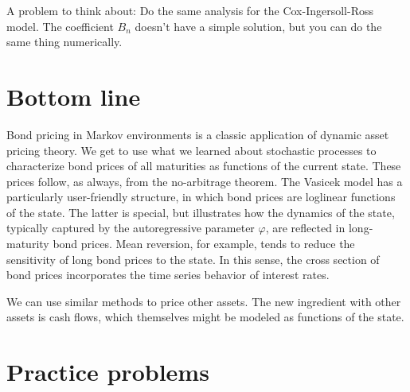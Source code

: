 \documentclass[11pt]{article}
\begin{document}
A problem to think about:  Do the same analysis for the Cox-Ingersoll-Ross model.
The coefficient $B_n$ doesn't have a simple solution, but you can do the same thing
numerically.

\begin{comment}
\section{The theory of long rates}
****** ???? *****
Perron-Frobenius stuff ???
\end{comment}


\section*{Bottom line}

Bond pricing in Markov environments is a classic application of dynamic asset pricing theory.
We get to use what we learned about stochastic processes to characterize
bond prices of all maturities as functions of the current state.
These prices follow, as always, from the no-arbitrage theorem.
The Vasicek model has a particularly user-friendly structure,
in which bond prices are loglinear functions of the state.
The latter is special, but illustrates how the dynamics of the state,
typically captured by the autoregressive parameter $\varphi$,
are reflected in long-maturity bond prices.
Mean reversion, for example, tends to reduce the sensitivity
of long bond prices to the state.
In this sense, the cross section of bond prices
incorporates the time series behavior of interest rates.

We can use similar methods to price other assets.
The new ingredient with other assets is cash flows,
which themselves might be modeled as functions of the state.


\section*{Practice problems}
\end{document}

